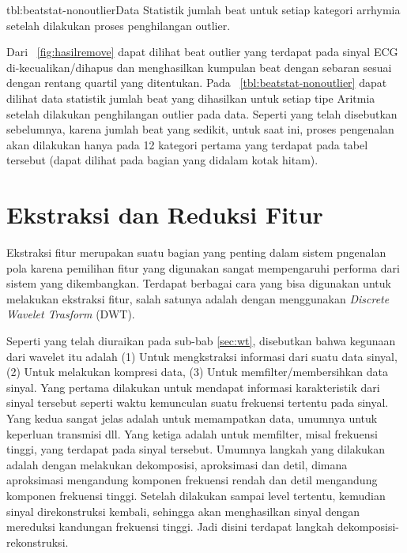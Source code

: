 {tbl:beatstat-nonoutlier}{Data Statistik jumlah beat untuk setiap  kategori
arrhymia setelah dilakukan proses penghilangan outlier.}

Dari \pic~\ref{fig:hasilremove} dapat dilihat beat outlier yang terdapat pada
sinyal ECG di-kecualikan/dihapus dan menghasilkan kumpulan beat dengan sebaran
sesuai dengan rentang quartil yang ditentukan. Pada
\tab~\ref{tbl:beatstat-nonoutlier} dapat dilihat data statistik jumlah beat yang
dihasilkan untuk setiap tipe Aritmia setelah dilakukan penghilangan outlier
pada data. Seperti yang telah disebutkan sebelumnya, karena jumlah beat yang
sedikit, untuk saat ini, proses pengenalan akan dilakukan hanya pada 12 kategori
pertama yang terdapat pada tabel tersebut (dapat dilihat pada bagian yang
didalam kotak hitam).

\section{Ekstraksi dan Reduksi Fitur}
\label{sec:ekstrakwt}
Ekstraksi fitur merupakan suatu bagian yang penting dalam sistem pngenalan pola
karena pemilihan fitur yang digunakan sangat mempengaruhi performa dari sistem
yang dikembangkan. Terdapat berbagai cara yang bisa digunakan untuk melakukan
ekstraksi fitur, salah satunya adalah dengan menggunakan \emph{Discrete Wavelet
Trasform} (DWT). 

Seperti yang telah diuraikan pada sub-bab \ref{sec:wt}, disebutkan
bahwa kegunaan dari wavelet itu adalah (1) Untuk mengkstraksi informasi dari
suatu data sinyal, (2) Untuk melakukan kompresi data, (3) Untuk
memfilter/membersihkan data sinyal. Yang pertama dilakukan untuk mendapat
informasi karakteristik dari sinyal tersebut seperti waktu kemunculan suatu
frekuensi tertentu pada sinyal. Yang kedua sangat jelas adalah untuk memampatkan
data, umumnya untuk keperluan transmisi dll. Yang ketiga adalah untuk memfilter,
misal frekuensi tinggi, yang terdapat pada sinyal tersebut. Umumnya langkah yang
dilakukan adalah dengan melakukan dekomposisi, aproksimasi dan detil, dimana
aproksimasi mengandung komponen frekuensi rendah dan detil mengandung komponen
frekuensi tinggi. Setelah dilakukan sampai level tertentu, kemudian sinyal
direkonstruksi kembali, sehingga akan menghasilkan sinyal dengan mereduksi
kandungan frekuensi tinggi. Jadi disini terdapat langkah
dekomposisi-rekonstruksi.

